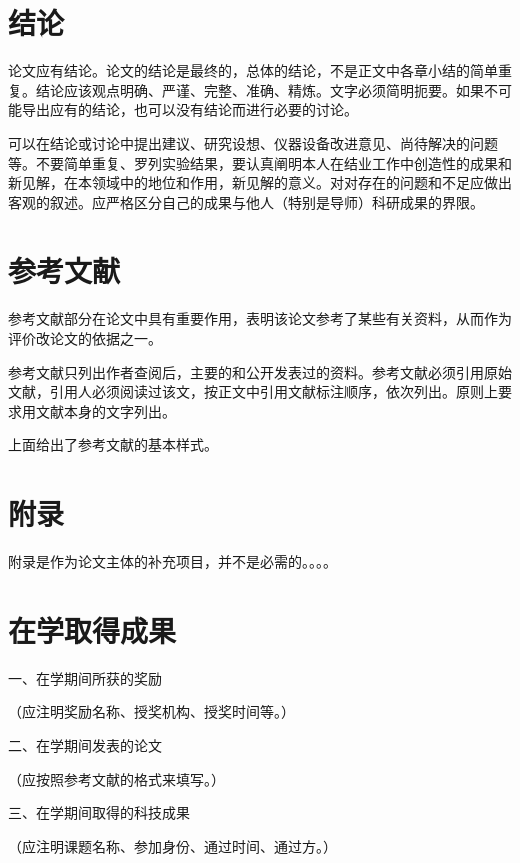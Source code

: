 \documentclass[UTF8]{ctexart}
\begin{document}
\newpage

\part*{结论}
\par
论文应有结论。论文的结论是最终的，总体的结论，不是正文中各章小结的简单重复。结论应该观点明确、严谨、完整、准确、精炼。文字必须简明扼要。如果不可能导出应有的结论，也可以没有结论而进行必要的讨论。\par
可以在结论或讨论中提出建议、研究设想、仪器设备改进意见、尚待解决的问题等。不要简单重复、罗列实验结果，要认真阐明本人在结业工作中创造性的成果和新见解，在本领域中的地位和作用，新见解的意义。对对存在的问题和不足应做出客观的叙述。应严格区分自己的成果与他人（特别是导师）科研成果的界限。\par
{}
\newpage

\part*{参考文献}
\par

\cite{1}
\cite{2}

\par
参考文献部分在论文中具有重要作用，表明该论文参考了某些有关资料，从而作为评价改论文的依据之一。\par
参考文献只列出作者查阅后，主要的和公开发表过的资料。参考文献必须引用原始文献，引用人必须阅读过该文，按正文中引用文献标注顺序，依次列出。原则上要求用文献本身的文字列出。\par
上面给出了参考文献的基本样式。\par
{}
\newpage
\part*{附录}
\par
附录是作为论文主体的补充项目，并不是必需的。。。。\par
{}
\newpage
\part*{在学取得成果}
\begin{spacing}{2}
一、在学期间所获的奖励 
\par 
（应注明奖励名称、授奖机构、授奖时间等。）
\par
二、在学期间发表的论文 
\par
（应按照参考文献的格式来填写。）
\par
三、在学期间取得的科技成果 
\par
（应注明课题名称、参加身份、通过时间、通过方。）
\end{spacing}
\newpage
\end{document}
